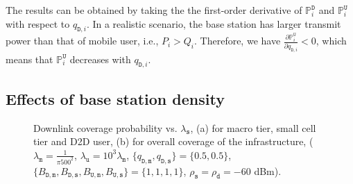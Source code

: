 \documentclass[twocolumn,english]{IEEEtran}
\theoremstyle{plain}
\theoremstyle{definition}
\begin{document}
The results can be obtained by taking the the first-order derivative
of $\mathbb{P}_{i}^{\mathtt{D}}$ and $\mathbb{P}_{i}^{\mathtt{U}}$
with respect to $q_{\mathtt{D},i}$. In a realistic scenario, the
base station has larger transmit power than that of mobile user, i.e.,
$P_{i}>Q_{i}$. Therefore, we have $\frac{\partial\mathbb{P}_{i}^{\mathtt{U}}}{\partial q_{\mathtt{D},i}}<0$,
which means that $\mathbb{P}_{i}^{\mathtt{U}}$ decreases with $q_{\mathtt{D},i}$.


\subsection{Effects of base station density}

\begin{figure}[t]


\protect\caption{\label{fig:Ave_Cove_dense}Downlink coverage probability vs. $\lambda_{\mathtt{s}}$,
(a) for macro tier, small cell tier and D2D user, (b) for overall
coverage of the infrastructure, ($\lambda_{\mathtt{m}}=\frac{1}{\pi500^{2}}$,
$\lambda_{\mathtt{u}}=10^{3}\lambda_{\mathtt{m}}$, $\{q_{\mathtt{D,m}},q_{\mathtt{D,s}}\}=\{0.5,0.5\}$,
$\{B_{\mathtt{D,m}},B_{\mathtt{D,s}},B_{\mathtt{U,m}},B_{\mathtt{U,s}}\}=\{1,1,1,1\}$,
$\rho_{\mathtt{s}}=\rho_{\mathtt{d}}=-60$ dBm). }
\end{figure}
\end{document}
